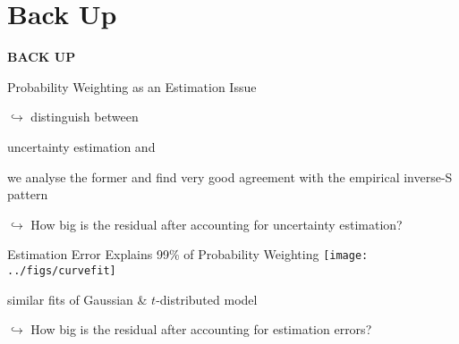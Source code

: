 \section*{Back Up}

\begin{frame}{}
\centering	\Huge{\textbf{BACK UP}}
\end{frame}

\begin{frame}{Probability Weighting as an Estimation Issue}

\vspace{1em}

\bi
	\item[$\hookrightarrow$] distinguish between
	\bi
		\item uncertainty estimation and
		\item {}
	\ei
	we analyse the former and find very good agreement with the empirical inverse-S pattern
	\item[$\hookrightarrow$] How big is the residual  after accounting for uncertainty estimation?
\ei
\vfill
\label{weight_vs_estimate}
\hyperlink{MainResults}{}
\end{frame}

\begin{frame}{Estimation Error Explains 99\% of Probability Weighting}
\bc
	\texttt{[image: ../figs/curvefit]}
\ec


\bi
	\item	similar fits of Gaussian \& $t$-distributed model%
	\item[$\hookrightarrow$] How big is the residual  after accounting for  estimation errors?
\ei
\hyperlink{MainResults}{}

\end{frame}